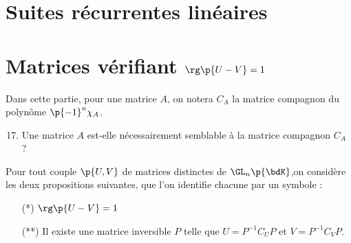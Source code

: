 \documentclass[a4paper,french,bookmarks]{article}
\begin{document}
    \section{Suites récurrentes linéaires}\label{sec:sec3}
    
    \section{Matrices vérifiant $\rg\p{U - V} = 1$}\label{sec:sec4}

    Dans cette partie, pour une matrice $A$, on notera $C_A$ la matrice compagnon du polynôme $\p{-1}^n\chi_A$.
    
    \begin{enumerate}
        \setcounter{enumi}{16}
        
        \item Une matrice $A$ est-elle nécessairement semblable à la matrice compagnon $C_A$ ?
        
    \end{enumerate}
    
    Pour tout couple $\p{U, V}$ de matrices distinctes de $\GL_n\p{\bdK}$,on considère les deux propositions suivantes, que l'on identifie chacune par un symbole :
        \begin{enumerate}
            \item[(*)] $\rg\p{U - V} = 1$
            
            \item[(**)] Il existe une matrice inversible $P$ telle que $U = P^{-1}C_UP$ et $V = P^{-1}C_VP$.
        \end{enumerate}
        
\end{document}
